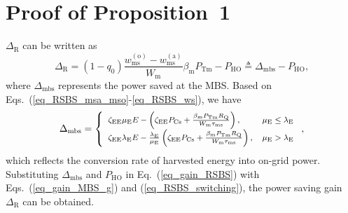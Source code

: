 \documentclass[12pt, draftclsnofoot,onecolumn]{IEEEtran}
\begin{document}
\section{Proof of Proposition~1}
\label{appendix_RSBS_gain}

$\Delta_\mathrm{R}$ can be written as
\begin{equation}\label{eq_gain_RSBS}
    \Delta_\mathrm{R} = (1 - q_0) \frac{w_\mathrm{ms}^{(\mathrm{o})}-w_\mathrm{ms}^{(\mathrm{a})}} {W_\mathrm{m}} \beta_\mathrm{m} P_\mathrm{Tm} - P_\mathrm{HO}
    \triangleq \Delta_\mathrm{mbs} - P_\mathrm{HO},
\end{equation}
where $\Delta_\mathrm{mbs}$ represents the power saved at the MBS.
Based on Eqs.~(\ref{eq_RSBS_msa_mso}-\ref{eq_RSBS_ws}), we have
\begin{equation}\label{eq_gain_MBS_g} \footnotesize
    \Delta_\mathrm{mbs} = \left\{ \begin{array}{ll} \zeta_\mathrm{EE} \mu_\mathrm{E} E - \left( \zeta_\mathrm{EE} P_\mathrm{Cs} + \frac{\beta_\mathrm{m} P_\mathrm{Tm} R_\mathrm{Q}}{W_\mathrm{m} \tau_\mathrm{ms}} \right), &  \mu_\mathrm{E}\leq \lambda_\mathrm{E} \\
    \zeta_\mathrm{EE} \lambda_\mathrm{E} E - \frac{\lambda_\mathrm{E}}{\mu_\mathrm{E}} \left( \zeta_\mathrm{EE} P_\mathrm{Cs} + \frac{\beta_\mathrm{m} P_\mathrm{Tm} R_\mathrm{Q}}{W_\mathrm{m} \tau_\mathrm{ms}} \right), & \mu_\mathrm{E} > \lambda_\mathrm{E}
    \end{array} \right. ,
\end{equation}
which reflects the conversion rate of harvested energy into on-grid power.
Substituting $\Delta_\mathrm{mbs}$ and $P_\mathrm{HO}$ in Eq.~(\ref{eq_gain_RSBS}) with Eqs.~(\ref{eq_gain_MBS_g}) and (\ref{eq_RSBS_switching}), the power saving gain $\Delta_\mathrm{R}$ can be obtained.
\end{document}
